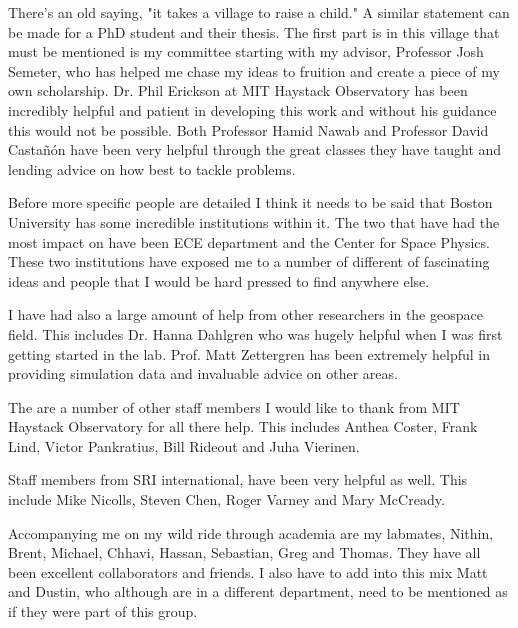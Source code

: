 There's an old saying, "it takes a village to raise a child." A similar statement can be made for a PhD student and their thesis. The first part is in this village that must be mentioned is my committee starting with my advisor, Professor Josh Semeter, who has helped me chase my ideas to fruition and create a piece of my own scholarship. Dr. Phil Erickson at MIT Haystack Observatory has been incredibly helpful and patient in developing this work and without his guidance this would not be possible. Both Professor Hamid Nawab and Professor David Castañón have been very helpful through the great classes they have taught and lending advice on how best to tackle problems.

Before more specific people are detailed I think it needs to be said that Boston University has some incredible institutions within it. The two that have had the most impact on have been ECE department and the Center for Space Physics. These two institutions have exposed me to a number of different of fascinating ideas and people that I would be hard pressed to find anywhere else.

I have had also a large amount of help from other researchers in the geospace field. This includes Dr. Hanna Dahlgren who was hugely helpful when I was first getting started in the lab. Prof. Matt Zettergren has been extremely helpful in providing simulation data and invaluable advice on other areas.

The are a number of other staff members I would like to thank from MIT Haystack Observatory for all there help. This includes Anthea Coster, Frank Lind, Victor Pankratius, Bill Rideout and Juha Vierinen. 

Staff members from SRI international, have been very helpful as well. This include Mike Nicolls, Steven Chen, Roger Varney and Mary McCready.
 
Accompanying me on my wild ride through academia are my labmates, Nithin, Brent, Michael, Chhavi, Hassan, Sebastian, Greg and Thomas. They have all been excellent collaborators and friends. I also have to add into this mix Matt and Dustin, who although are in a different department, need to be mentioned as if they were part of this group.



\vskip 1in

\noindent
